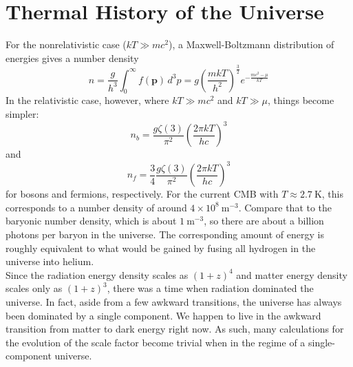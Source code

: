 \documentclass[10pt]{article}
\numberwithin{equation}{section}
\newcommand{\n}{\noindent}
\begin{document}

\section{Thermal History of the Universe} %
\label{sec:thermal_history_of_the_universe}
For the nonrelativistic case ($kT\gg mc^2$), a Maxwell-Boltzmann distribution of energies gives a number density 
\begin{equation}
	\label{eq:thermal:1} n = \frac{g}{h^3}\int_0^\infty f(\mathbf{p})\,d^3p = g\left(\frac{mkT}{h^2}\right)^{\frac{3}{2}} e^{-\frac{mc^2-\mu}{kT}}
\end{equation}
In the relativistic case, however, where $kT\gg mc^2$ and $kT\gg\mu$, things become simpler:
\begin{equation}
	\label{eq:thermal:2} n_b = \frac{g\zeta(3)}{\pi^2} \left(\frac{2\pi k T}{hc}\right)^3
\end{equation}
and
\begin{equation}
	\label{eq:thermal:3} n_f = \frac{3}{4}\frac{g\zeta(3)}{\pi^2} \left(\frac{2\pi k T}{hc}\right)^3
\end{equation}
for bosons and fermions, respectively. For the current CMB with $T\approx 2.7\ \mathrm{K}$, this corresponds to a number density of around $4\times 10^8\ \mathrm{m^{-3}}$. Compare that to the baryonic number density, which is about $1\ \mathrm{m^{-3}}$, so there are about a billion photons per baryon in the universe. The corresponding amount of energy is roughly equivalent to what would be gained by fusing all hydrogen in the universe into helium.\\

\n Since the radiation energy density scales as $(1+z)^4$ and matter energy density scales only as $(1+z)^3$, there was a time when radiation dominated the universe. In fact, aside from a few awkward transitions, the universe has always been dominated by a single component. We happen to live in the awkward transition from matter to dark energy right now. As such, many calculations for the evolution of the scale factor become trivial when in the regime of a single-component universe.
\end{document}
